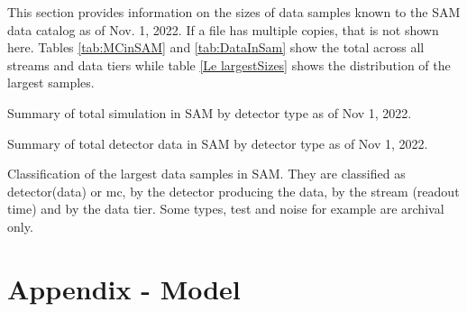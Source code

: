\documentclass[12pt]{article}
\begin{document}
This section provides information on the sizes of data samples known to the SAM data catalog as of Nov. 1, 2022.  If a file has multiple copies, that is not shown here.  Tables \ref{tab:MCinSAM} and \ref{tab:DataInSam} show the total across all streams and data tiers while table \ref{Le largestSizes} shows the distribution of the largest samples.  


\begin{table}[ht]
 \centering{}
 \label{tab:MCinSAM}
\caption{Summary  of total simulation in SAM by detector type as of Nov 1, 2022.}
\end{table}

\begin{table}[ht]
 \centering{}
 \label{tab:DataInSam}
\caption{Summary  of total detector data in SAM by detector type as of Nov 1, 2022.}
\end{table}
\clearpage

\begin{table}[ht]
 \centering{}
 \label{tab:LargestSizes}
\caption{Classification of the largest data samples in SAM.  They are classified as detector(data) or mc, by the detector producing the data, by the stream (readout time) and by the data tier.  Some types, test and noise for example are archival only.  }
\end{table}

\section{Appendix - Model }

\end{document}
